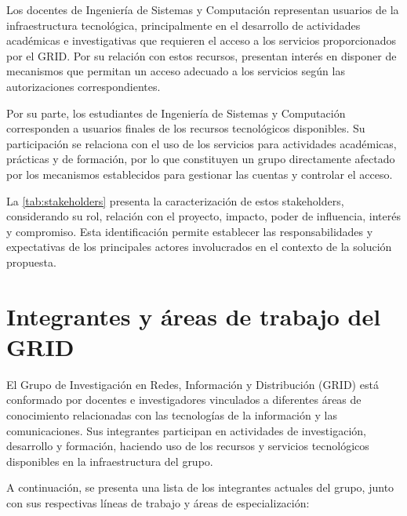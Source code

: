 Los docentes de Ingeniería de Sistemas y Computación representan usuarios de la infraestructura tecnológica, principalmente en el desarrollo de actividades académicas e investigativas que requieren el acceso a los servicios proporcionados por el \ac{GRID}. Por su relación con estos recursos, presentan interés en disponer de mecanismos que permitan un acceso adecuado a los servicios según las autorizaciones correspondientes.

Por su parte, los estudiantes de Ingeniería de Sistemas y Computación corresponden a usuarios finales de los recursos tecnológicos disponibles. Su participación se relaciona con el uso de los servicios para actividades académicas, prácticas y de formación, por lo que constituyen un grupo directamente afectado por los mecanismos establecidos para gestionar las cuentas y controlar el acceso.

La \autoref{tab:stakeholders} presenta la caracterización de estos stakeholders, considerando su rol, relación con el proyecto, impacto, poder de influencia, interés y compromiso. Esta identificación permite establecer las responsabilidades y expectativas de los principales actores involucrados en el contexto de la solución propuesta.



\section{Integrantes y áreas de trabajo del \texorpdfstring{\ac{GRID}}{GRID}}

El Grupo de Investigación en Redes, Información y Distribución (\ac{GRID}) está conformado por docentes e investigadores vinculados a diferentes áreas de conocimiento relacionadas con las tecnologías de la información y las comunicaciones. Sus integrantes participan en actividades de investigación, desarrollo y formación, haciendo uso de los recursos y servicios tecnológicos disponibles en la infraestructura del grupo.

A continuación, se presenta una lista de los integrantes actuales del grupo, junto
con sus respectivas líneas de trabajo y áreas de especialización:

